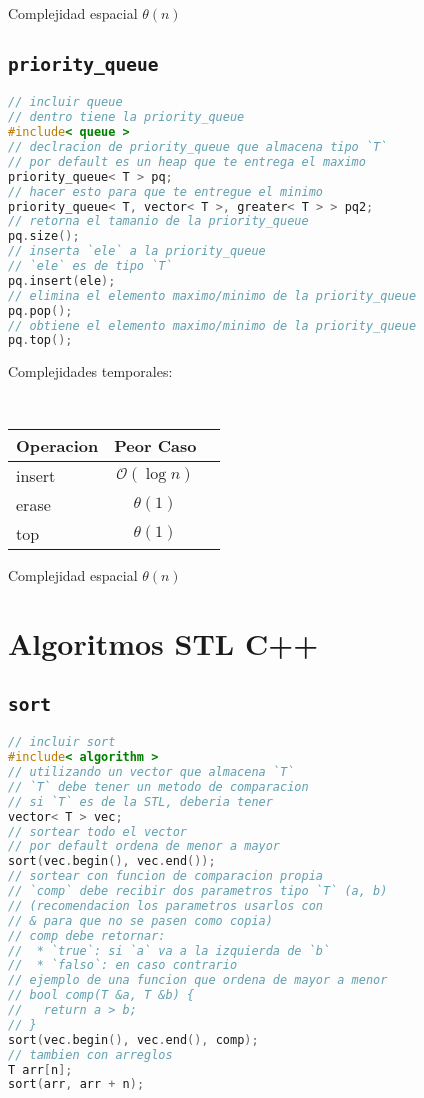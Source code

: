 \documentclass{article}
\newcommand{\bigO}{\mathcal{O}}
\begin{document}
\begin{multicols}{2}
Complejidad espacial $\theta(n)$

\subsection*{\tt \footnotesize priority\_queue}

\begin{lstlisting}[language=C++]
// incluir queue
// dentro tiene la priority_queue
#include< queue >
// declracion de priority_queue que almacena tipo `T`
// por default es un heap que te entrega el maximo
priority_queue< T > pq;
// hacer esto para que te entregue el minimo
priority_queue< T, vector< T >, greater< T > > pq2;
// retorna el tamanio de la priority_queue
pq.size();
// inserta `ele` a la priority_queue
// `ele` es de tipo `T`
pq.insert(ele);
// elimina el elemento maximo/minimo de la priority_queue
pq.pop();
// obtiene el elemento maximo/minimo de la priority_queue
pq.top();
\end{lstlisting}

Complejidades temporales:
\begin{table}[H]
  \tt \scriptsize
  \begin{center}
    \begin{tabular}[c]{l|c|c}
      \hline
      Operacion & Peor Caso\\
      \hline
      insert & $\bigO(\log n)$\\
      \hline
      erase & $\theta(1)$\\
      \hline
      top & $\theta(1)$\\
      \hline
    \end{tabular}
  \end{center}
\end{table}

Complejidad espacial $\theta(n)$

\section*{\small Algoritmos STL C++}

\subsection*{\tt \footnotesize sort}
\begin{lstlisting}[language=C++]
// incluir sort
#include< algorithm >
// utilizando un vector que almacena `T`
// `T` debe tener un metodo de comparacion
// si `T` es de la STL, deberia tener
vector< T > vec;
// sortear todo el vector
// por default ordena de menor a mayor
sort(vec.begin(), vec.end());
// sortear con funcion de comparacion propia
// `comp` debe recibir dos parametros tipo `T` (a, b)
// (recomendacion los parametros usarlos con 
// & para que no se pasen como copia)
// comp debe retornar:
//  * `true`: si `a` va a la izquierda de `b` 
//  * `falso`: en caso contrario
// ejemplo de una funcion que ordena de mayor a menor
// bool comp(T &a, T &b) {
//   return a > b;
// }
sort(vec.begin(), vec.end(), comp);
// tambien con arreglos
T arr[n];
sort(arr, arr + n);
\end{lstlisting}


\end{multicols}
\end{document}
